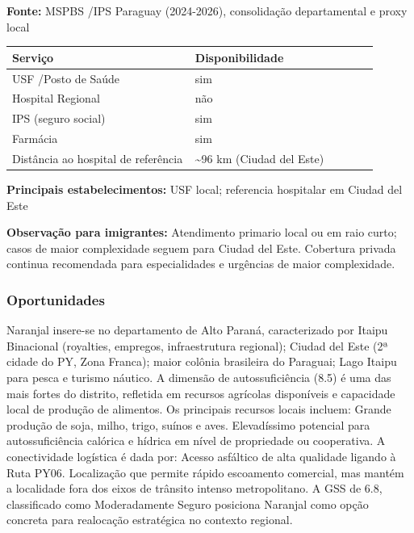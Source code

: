 \textbf{Fonte:} MSPBS /\allowbreak  IPS Paraguay (2024-2026), consolidação
departamental e proxy local

{\def\LTcaptype{none} %
\begin{longtable}{@{}>{\raggedright\arraybackslash}p{0.45\linewidth} >{\raggedright\arraybackslash}p{0.45\linewidth}@{}}
\toprule\noalign{}
Serviço & Disponibilidade \\
\midrule\noalign{}
\endhead
\bottomrule\noalign{}
\endlastfoot
USF /\allowbreak  Posto de Saúde & sim \\
Hospital Regional & não \\
IPS (seguro social) & sim \\
Farmácia & sim \\
Distância ao hospital de referência & \textasciitilde96 km (Ciudad del
Este) \\
\end{longtable}
}

\textbf{Principais estabelecimentos:} USF local; referencia hospitalar
em Ciudad del Este

\textbf{Observação para imigrantes:} Atendimento primario local ou em
raio curto; casos de maior complexidade seguem para Ciudad del Este.
Cobertura privada continua recomendada para especialidades e urgências
de maior complexidade.
\newpage

\subsubsection*{Oportunidades}\label{oport-naranjal-1014}
Naranjal insere-se no departamento de Alto Paraná, caracterizado por Itaipu Binacional (royalties, empregos, infraestrutura regional); Ciudad del Este (2ª cidade do PY, Zona Franca); maior colônia brasileira do Paraguai; Lago Itaipu para pesca e turismo náutico. A dimensão de autossuficiência (8.5) é uma das mais fortes do distrito, refletida em recursos agrícolas disponíveis e capacidade local de produção de alimentos. Os principais recursos locais incluem: Grande produção de soja, milho, trigo, suínos e aves. Elevadíssimo potencial para autossuficiência calórica e hídrica em nível de propriedade ou cooperativa. A conectividade logística é dada por: Acesso asfáltico de alta qualidade ligando à Ruta PY06. Localização que permite rápido escoamento comercial, mas mantém a localidade fora dos eixos de trânsito intenso metropolitano. A GSS de 6.8, classificado como Moderadamente Seguro posiciona Naranjal como opção concreta para realocação estratégica no contexto regional.

